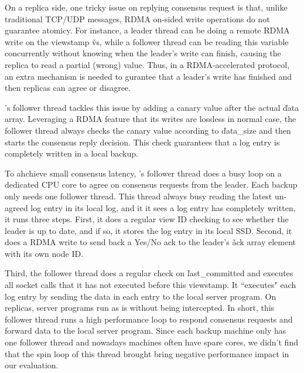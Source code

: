 On a replica side, one tricky issue on replying consensus request is that, 
unlike traditional TCP/UDP messages, RDMA on-sided write operations do not 
guarantee atomicy. For instance, a leader thread can be doing a remote RDMA 
write on the viewstamp \v{vs}, while a follower thread can be reading this 
variable concurrently without knowing when the leader's write can finish, 
causing the replica to read a partial (wrong) value. Thus, in a 
RDMA-accelerated protocol, an extra mechanism is needed to gurantee that a 
leader's write has finished and then replicas can agree or disagree.

\xxx's follower thread tackles this issue by adding a canary value after the 
actual \v{data} array. Leveraging a RDMA feature that its writes are lossless 
in normal case, the follower thread always checks the canary value according to 
\v{data\_size} and then starts the consensus reply decision. This check 
guarantees that a log entry is completely written in a local backup.

To ahchieve small consensus latency, \xxx's follower thread does a busy loop 
on a dedicated CPU core to agree on consensus requests from the leader. Each 
backup only needs one follower thread. This thread always busy reading the 
latest un-agreed log entry in its local log, and it it sees a log entry has 
completely written, it runs three steps. First, it does a regular \paxos view 
ID checking to see whether the leader is up to date, and if so, it stores the 
log entry in its local SSD. Second, it does a RDMA write to send back a Yes/No 
ack to the leader's \v{ack} array element with its own node ID.

Third, the follower thread does a regular \paxos check on \v{last\_committed} 
and executes all socket calls that it has not executed before this viewstamp. 
It ``executes" each log entry by sending the data in each entry to the local 
server program. On replicas, server programs run as is without being 
intercepted. In short, this follower thread runs a high performance loop to 
respond consensus requests and forward data to the local server program. Since 
each backup machine only has one follower thread and nowadays machines often 
have spare cores, we didn't find that the spin loop of this thread brought 
bring negative performance impact in our evaluation.


